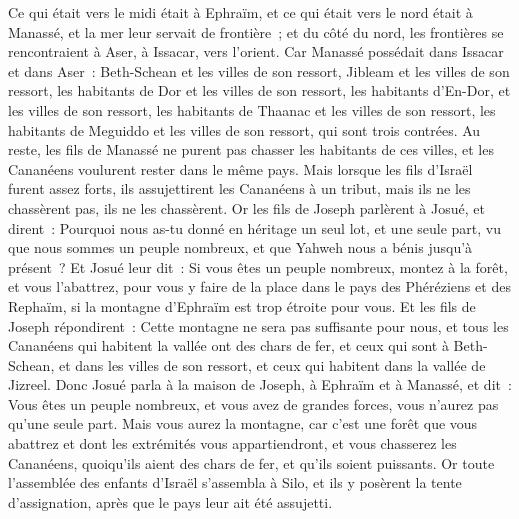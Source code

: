 \begin{multicols}{2}
Ce qui était vers le midi était à Ephraïm, et ce qui était vers le nord était à Manassé, et la mer leur servait de frontière~; et du côté du nord, les frontières se rencontraient à Aser, à Issacar, vers l'orient.
Car Manassé possédait dans Issacar et dans Aser~: Beth-Schean et les villes de son ressort, Jibleam et les villes de son ressort, les habitants de Dor et les villes de son ressort, les habitants d'En-Dor, et les villes de son ressort, les habitants de Thaanac et les villes de son ressort, les habitants de Meguiddo et les villes de son ressort, qui sont trois contrées.
Au reste, les fils de Manassé ne purent pas chasser les habitants de ces villes, et les Cananéens voulurent rester dans le même pays.
Mais lorsque les fils d'Israël furent assez forts, ils assujettirent les Cananéens à un tribut, mais ils ne les chassèrent pas, ils ne les chassèrent.
Or les fils de Joseph parlèrent à Josué, et dirent~: Pourquoi nous as-tu donné en héritage un seul lot, et une seule part, vu que nous sommes un peuple nombreux, et que Yahweh nous a bénis jusqu'à présent~?
Et Josué leur dit~: Si vous êtes un peuple nombreux, montez à la forêt, et vous l'abattrez, pour vous y faire de la place dans le pays des Phéréziens et des Rephaïm, si la montagne d'Ephraïm est trop étroite pour vous.
Et les fils de Joseph répondirent~: Cette montagne ne sera pas suffisante pour nous, et tous les Cananéens qui habitent la vallée ont des chars de fer, et ceux qui sont à Beth-Schean, et dans les villes de son ressort, et ceux qui habitent dans la vallée de Jizreel.
Donc Josué parla à la maison de Joseph, à Ephraïm et à Manassé, et dit~: Vous êtes un peuple nombreux, et vous avez de grandes forces, vous n'aurez pas qu'une seule part.
Mais vous aurez la montagne, car c'est une forêt que vous abattrez et dont les extrémités vous appartiendront, et vous chasserez les Cananéens, quoiqu'ils aient des chars de fer, et qu'ils soient puissants.
\VerseOne{}Or toute l'assemblée des enfants d'Israël s'assembla à Silo, et ils y posèrent la tente d'assignation, après que le pays leur ait été assujetti.

\end{multicols}
